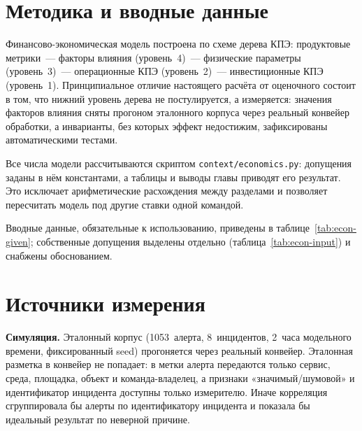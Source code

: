 \documentclass[utf8x, 12pt]{G7-32} %
\begin{document}
\section{Методика и вводные данные}
Финансово-экономическая модель построена по схеме дерева КПЭ: продуктовые
метрики~--- факторы влияния (уровень~4)~--- физические параметры (уровень~3)~---
операционные КПЭ (уровень~2)~--- инвестиционные КПЭ (уровень~1).
Принципиальное отличие настоящего расчёта от оценочного состоит в том, что
нижний уровень дерева не постулируется, а измеряется: значения факторов влияния
сняты прогоном эталонного корпуса через реальный конвейер обработки, а
инварианты, без которых эффект недостижим, зафиксированы автоматическими
тестами.

Все числа модели рассчитываются скриптом \texttt{context/economics.py}:
допущения заданы в нём константами, а таблицы и выводы главы приводят его
результат. Это исключает арифметические расхождения между разделами и
позволяет пересчитать модель под другие ставки одной командой.

Вводные данные, обязательные к использованию, приведены в
таблице~\ref{tab:econ-given}; собственные допущения выделены отдельно
(таблица~\ref{tab:econ-input}) и снабжены обоснованием.

\begin{table}[H]
\centering
\caption{Обязательные вводные данные}
\label{tab:econ-given}
\end{table}

\section{Источники измерения}
\textbf{Симуляция.} Эталонный корпус (1053~алерта, 8~инцидентов, 2~часа
модельного времени, фиксированный seed) прогоняется через реальный конвейер.
Эталонная разметка в конвейер не попадает: в метки алерта передаются только
сервис, среда, площадка, объект и команда-владелец, а признаки
«значимый/шумовой» и идентификатор инцидента доступны только измерителю.
Иначе корреляция сгруппировала бы алерты по идентификатору инцидента и показала
бы идеальный результат по неверной причине.
\end{document}
